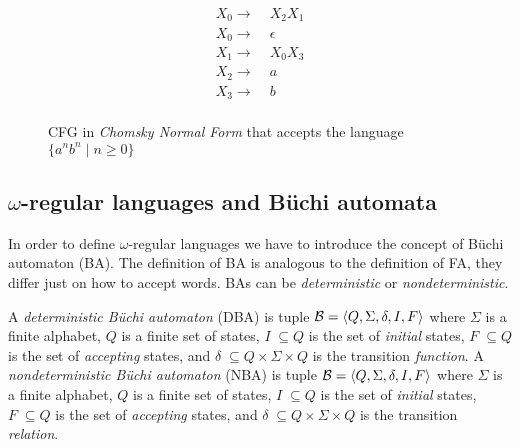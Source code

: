 \begin{figure}[h]
\centering
\begin{equation*}
\begin{split}
X_0 \rightarrow \; & X_2X_1 \\
X_0 \rightarrow \; & \epsilon \\
X_1 \rightarrow \; & X_0X_3 \\
X_2 \rightarrow \; & a \\
X_3 \rightarrow \; & b \\
\end{split}
\end{equation*}
\caption{CFG in \emph{Chomsky Normal Form} that accepts the language $\{a^nb^n \;|\; n \geq 0\}$}
\label{fig:example-cfg-chomsky}
\end{figure}


\subsection{$\omega$-regular languages and B{\"u}chi automata}
In order to define $\omega$-regular languages we have to introduce the concept
of B{\"u}chi automaton (BA).
The definition of BA is analogous to the definition of FA, they differ just on how
to accept words.
BAs can be \emph{deterministic} or \emph{nondeterministic}.

A \emph{deterministic B{\"u}chi automaton} (DBA) is tuple
$\mathcal{B}=\langle Q, \Sigma, \delta, I, F\rangle$ where $\Sigma$ is a finite alphabet, $Q$ is a finite set of states,
$I \; \subseteq Q$ is the set of \emph{initial} states, $F \; \subseteq Q$ is
the set of \emph{accepting}  states, and $\delta \; \subseteq Q \times \Sigma \times Q$
is the transition \emph{function}.
A \emph{nondeterministic B{\"u}chi automaton} (NBA) is tuple
$\mathcal{B}=\langle Q, \Sigma, \delta, I, F\rangle$ where $\Sigma$ is a finite alphabet, $Q$ is a finite set of states,
$I \; \subseteq Q$ is the set of \emph{initial} states, $F \; \subseteq Q$ is
the set of \emph{accepting}  states, and $\delta \; \subseteq Q \times \Sigma \times Q$
is the transition \emph{relation}.


